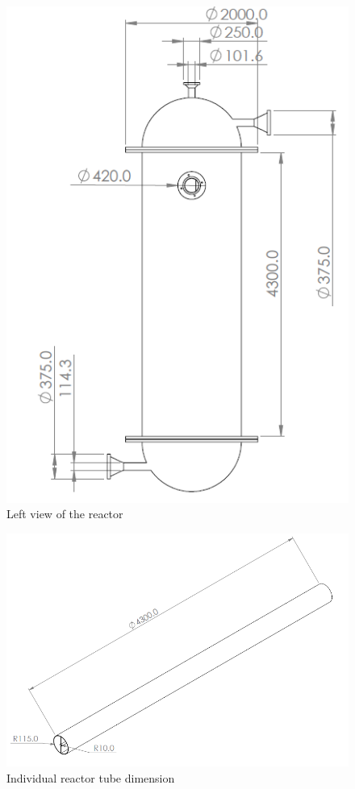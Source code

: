 \begin{figure}[h]
\begin{minipage}[t]{0.49\linewidth}
        \includegraphics[width=\linewidth]{chapters/2-reaction/figures/FYD reactor left view with calc.PNG}
        \caption{Left view of the reactor}
        \label{fig:reactorleft}
    \end{minipage}
\end{figure}

\begin{figure}
    \centering
    \includegraphics{chapters/2-reaction/figures/FYD solo tube with calc.PNG}
    \caption{Individual reactor tube dimension}
    \label{fig:soloreactor }
\end{figure}
